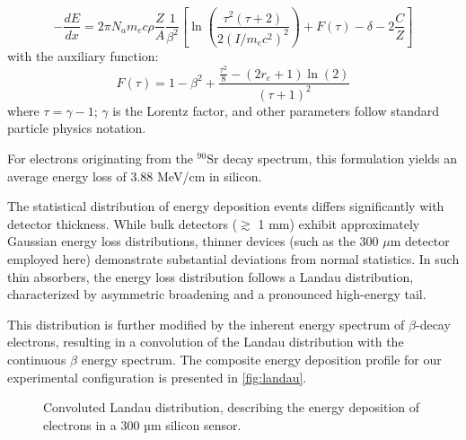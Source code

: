 \begin{equation}
    -\frac{dE}{dx} = 2\pi N_a m_e c \rho \frac{Z}{A} \frac{1}{\beta^2} \left[ \ln \left( \frac{\tau^{2}(\tau + 2)}{2(I/m_e c^2)^2} \right) + F(\tau) - \delta - 2\frac{C}{Z} \right]
\end{equation}
with the auxiliary function:
\begin{equation}
    F(\tau) = 1 - \beta^2 + \frac{\frac{\tau^2}{8} -(2r_e + 1)\ln(2)}{(\tau + 1)^2}
\end{equation}
where $\tau = \gamma - 1$; $\gamma$ is the Lorentz factor, and other parameters follow standard particle physics notation.

For electrons originating from the $^{90}\mathrm{Sr}$ decay spectrum, this formulation yields an average energy loss of 3.88 MeV/cm in silicon.

The statistical distribution of energy deposition events differs significantly with detector thickness. While bulk detectors ($\gtrsim$ 1 mm) exhibit approximately Gaussian energy loss distributions, thinner devices (such as the 300 $\mu$m detector employed here) demonstrate substantial deviations from normal statistics. In such thin absorbers, the energy loss distribution follows a Landau distribution, characterized by asymmetric broadening and a pronounced high-energy tail.

This distribution is further modified by the inherent energy spectrum of $\beta$-decay electrons, resulting in a convolution of the Landau distribution with the continuous $\beta$ energy spectrum. The composite energy deposition profile for our experimental configuration is presented in \autoref{fig:landau}.

\begin{figure}[H]
	\centering
	\caption{Convoluted Landau distribution, describing the energy deposition of electrons in a 300 µm silicon sensor.}
	\label{fig:landau}
\end{figure}
